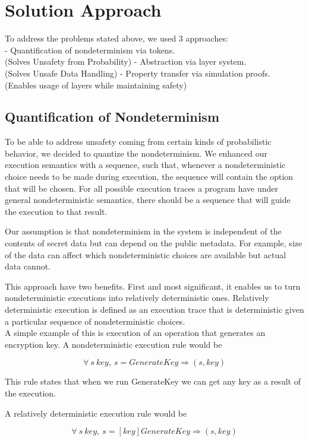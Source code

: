 \section{Solution Approach}
To address the problems stated above, we used 3 approaches:\\
- Quantification of nondeterminism via tokens.\\ (Solves Unsafety from Probability)
- Abstraction via layer system.\\ (Solves Unsafe Data Handling) %
- Property transfer via simulation proofs. (Enables usage of layers while maintaining safety)


\subsection{Quantification of Nondeterminism}
To be able to address unsafety coming from certain kinds of probabilistic behavior, we decided to quantize the nondeterminism. We enhanced our execution semantics with a sequence, such that, whenever a nondeterministic choice needs to be made during execution, the sequence will contain the option that will be chosen. For all possible execution traces a program have under general nondeterministic semantics, there should be a sequence that will guide the execution to that result. 

Our assumption is that nondeterminism in the system is independent of the contents of secret data but can depend on the public metadata. For example, size of the data can affect which nondeterministic choices are available but actual data cannot.

This approach have two benefits. First and most significant, it enables us to
turn nondeterministic executions into relatively deterministic ones. 
Relatively deterministic execution is defined as an execution trace that is 
deterministic given a particular sequence of nondeterministic choices.\\

A simple example of this is execution of an operation that generates an encryption key. 
A nondeterministic execution rule would be

$$\forall\ s\ key,\ s  =GenerateKey\Rightarrow (s, key)$$ 

This rule states that when we run GenerateKey we can get any key as a result of the execution.

A relatively deterministic execution rule would be

$$\forall\ s\ key,\ s  =[key]GenerateKey\Rightarrow (s, key)$$ 

